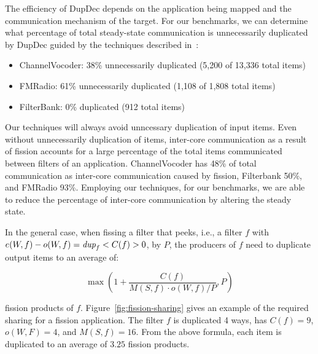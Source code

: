 The efficiency of DupDec depends on the application being mapped and
the communication mechanism of the target. For our benchmarks, we can
determine what percentage of total steady-state communication is
unnecessarily duplicated by DupDec guided by the techniques described
in~\cite{gordon-asplos06}:

\begin{itemize}
\item ChannelVocoder: 38\% unnecessarily duplicated (5,200 of 13,336
      total items)
\item FMRadio: 61\% unnecessarily duplicated (1,108 of
      1,808 total items) 
\item FilterBank: 0\% duplicated (912 total items)
\end{itemize}

Our techniques will always avoid unncessary duplication of input
items.  Even without unnecessarily duplication of items, inter-core
communication as a result of fission accounts for a large percentage
of the total items communicated between filters of an application.
ChannelVocoder has 48\% of total communication as inter-core
communication caused by fission, Filterbank 50\%, and FMRadio 93\%.
Employing our techniques, for our benchmarks, we are able to reduce
the percentage of inter-core communication by altering the steady
state.

In the general case, when fissing a filter that peeks, i.e., a filter
$f$ with $e(W, f) - o(W, f) = \mbox{\it dup}_f < C(f) > 0$, by $P$, the producers
of $f$ need to duplicate output items to an average of:

\[ \max \left ( 1 + \frac{C(f)}{M(S, f) \cdot o(W, f) / P}, P \right )\]

\noindent fission products of $f$.  Figure~\ref{fig:fission-sharing}
gives an example of the required sharing for a fission application.
The filter $f$ is duplicated 4 ways, has $C(f) = 9$, $o(W, F) = 4$,
and $M(S, f) = 16$.  From the above formula, each item is duplicated
to an average of $3.25$ fission products.
